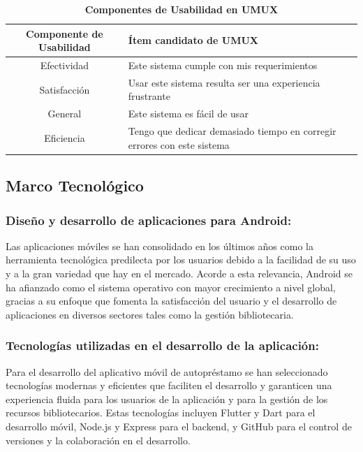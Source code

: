 \documentclass[spanish]{ieee_upb}
\begin{document}
\begin{table}[htpb]
    \centering
    \caption[Nombre en la lista de tablas]{\bfseries Componentes de Usabilidad en UMUX }
    \label{tabla:1}
   
    \begin{tabular}{|c|p{11cm}|} \hline 
         \textbf{Componente de Usabilidad}&  \textbf{Ítem candidato de UMUX}\\ \hline 
         Efectividad  & Este sistema cumple con mis requerimientos \\ \hline 
         Satisfacción &Usar este sistema resulta ser una experiencia frustrante \\ \hline 
         General      & Este sistema es fácil de usar \\ \hline
         Eficiencia   & Tengo que dedicar demasiado tiempo en corregir errores con este sistema \\ \hline
    \end{tabular}
   
    
\end{table}



\subsection{Marco Tecnológico}
\subsubsection{Diseño y desarrollo de aplicaciones para Android: }
Las aplicaciones móviles se han consolidado en los últimos años como la herramienta tecnológica predilecta por los usuarios debido a la facilidad de su uso y a la gran variedad que hay en el mercado. Acorde a esta relevancia, Android se ha afianzado como el sistema operativo con mayor crecimiento a nivel global, gracias a su enfoque que fomenta la satisfacción del usuario y el desarrollo de aplicaciones en diversos sectores tales como la gestión bibliotecaria. \cite{Statista2025} \cite{polanco2011android}

\subsubsection{Tecnologías utilizadas en el desarrollo de la aplicación: }
Para el desarrollo del aplicativo móvil de autopréstamo se han seleccionado tecnologías modernas y eficientes que faciliten el desarrollo y garanticen una experiencia fluida para los usuarios de la aplicación y para la gestión de los recursos bibliotecarios. Estas tecnologías incluyen Flutter y Dart para el desarrollo móvil, Node.js y Express para el backend, y GitHub para el control de versiones y la colaboración en el desarrollo.
\vspace{0.3 cm}
\end{document}
